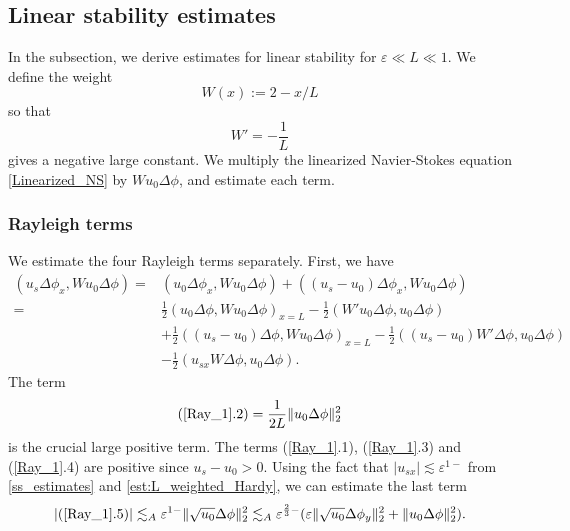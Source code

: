 \documentclass[reqno, 11pt]{amsart}
\theoremstyle{plain}
\theoremstyle{definition}
\theoremstyle{remark}
\numberwithin{equation}{section}
\begin{document}
\subsection{Linear stability estimates}\label{sec:L_linear} In the subsection, we derive estimates for linear stability for $\varepsilon \ll L \ll 1$. We define the weight
$$W(x) := 2 - x/L$$ so that $$W' = - \frac{1}{L}$$ gives a negative large constant. We multiply the linearized Navier-Stokes equation \eqref{Linearized_NS} by $W u_0 \Delta \phi$, and estimate each term.

\subsubsection{Rayleigh terms}

We estimate the four Rayleigh terms separately. First, we have
\begin{equation}\label{Ray_1}
\begin{aligned}
(u_s \Delta \phi_x , Wu_0 \Delta \phi) =& (u_0 \Delta \phi_x , Wu_0 \Delta \phi) + ((u_{s} - u_0) \Delta \phi_x , Wu_0 \Delta \phi)\\
=& \frac{1}{2} (u_0 \Delta \phi, W u_0 \Delta \phi)_{x=L} - \frac{1}{2}(W' u_0 \Delta \phi, u_0 \Delta \phi)\\
&+\frac{1}{2}( (u_{s} - u_0)\Delta \phi, Wu_0 \Delta \phi)_{x=L} - \frac{1}{2} ((u_{s} - u_0)W' \Delta \phi , u_0 \Delta \phi) \\
&- \frac{1}{2} (u_{sx}W \Delta \phi , u_0 \Delta \phi).
\end{aligned}
\end{equation}
The term 
\begin{equation}\label{Ray_crucial}
(\ref{Ray_1}.2)= \frac{1}{2L} \|u_0 \Delta \phi\|_2^2
\end{equation}
is the crucial large positive term. The terms (\ref{Ray_1}.1), (\ref{Ray_1}.3) and (\ref{Ray_1}.4) are positive since $u_s - u_0 > 0$. Using the fact that $|u_{sx}| \lesssim \varepsilon^{1-}$ from \eqref{ss_estimates} and \eqref{est:L_weighted_Hardy}, we can estimate the last term
\begin{equation}\label{Ray_1-1}
\begin{aligned}
|(\ref{Ray_1}.5)| \lesssim_A  \varepsilon^{1-} \| \sqrt{u_0} \Delta \phi\|_2^2  
\lesssim_A   \varepsilon^{\frac{2}{3}-} ( \varepsilon \| \sqrt{u_0} \Delta \phi_y \|_2^2 +  \|u_0 \Delta \phi\|_2^2).
\end{aligned}
\end{equation}
\end{document}
